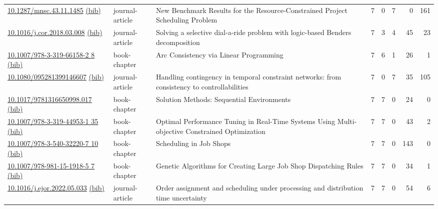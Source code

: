 {\begin{longtable}{p{5cm}lp{11cm}rrrrr}
\href{http://dx.doi.org/10.1287/mnsc.43.11.1485}{10.1287/mnsc.43.11.1485} \href{https://www.doi2bib.org/bib/10.1287/mnsc.43.11.1485}{(bib)} & journal-article & New Benchmark Results for the Resource-Constrained Project Scheduling Problem & 7 & 0 & 7 & 0 & 161 \\
\href{http://dx.doi.org/10.1016/j.cor.2018.03.008}{10.1016/j.cor.2018.03.008} \href{https://www.doi2bib.org/bib/10.1016/j.cor.2018.03.008}{(bib)} & journal-article & Solving a selective dial-a-ride problem with logic-based Benders decomposition & 7 & 3 & 4 & 45 & 23 \\
\href{http://dx.doi.org/10.1007/978-3-319-66158-2_8}{10.1007/978-3-319-66158-2 8} \href{https://www.doi2bib.org/bib/10.1007/978-3-319-66158-2_8}{(bib)} & book-chapter & Arc Consistency via Linear Programming & 7 & 6 & 1 & 26 & 1 \\
\href{http://dx.doi.org/10.1080/095281399146607}{10.1080/095281399146607} \href{https://www.doi2bib.org/bib/10.1080/095281399146607}{(bib)} & journal-article & Handling contingency in temporal constraint networks: from consistency to controllabilities & 7 & 0 & 7 & 35 & 105 \\
\href{http://dx.doi.org/10.1017/9781316650998.017}{10.1017/9781316650998.017} \href{https://www.doi2bib.org/bib/10.1017/9781316650998.017}{(bib)} & book-chapter & Solution Methods: Sequential Environments & 7 & 7 & 0 & 24 & 0 \\
\href{http://dx.doi.org/10.1007/978-3-319-44953-1_35}{10.1007/978-3-319-44953-1 35} \href{https://www.doi2bib.org/bib/10.1007/978-3-319-44953-1_35}{(bib)} & book-chapter & Optimal Performance Tuning in Real-Time Systems Using Multi-objective Constrained Optimization & 7 & 7 & 0 & 43 & 2 \\
\href{http://dx.doi.org/10.1007/978-3-540-32220-7_10}{10.1007/978-3-540-32220-7 10} \href{https://www.doi2bib.org/bib/10.1007/978-3-540-32220-7_10}{(bib)} & book-chapter & Scheduling in Job Shops & 7 & 7 & 0 & 143 & 0 \\
\href{http://dx.doi.org/10.1007/978-981-15-1918-5_7}{10.1007/978-981-15-1918-5 7} \href{https://www.doi2bib.org/bib/10.1007/978-981-15-1918-5_7}{(bib)} & book-chapter & Genetic Algorithms for Creating Large Job Shop Dispatching Rules & 7 & 7 & 0 & 34 & 1 \\
\href{http://dx.doi.org/10.1016/j.ejor.2022.05.033}{10.1016/j.ejor.2022.05.033} \href{https://www.doi2bib.org/bib/10.1016/j.ejor.2022.05.033}{(bib)} & journal-article & Order assignment and scheduling under processing and distribution time uncertainty & 7 & 7 & 0 & 54 & 6 \\

\end{longtable}}

